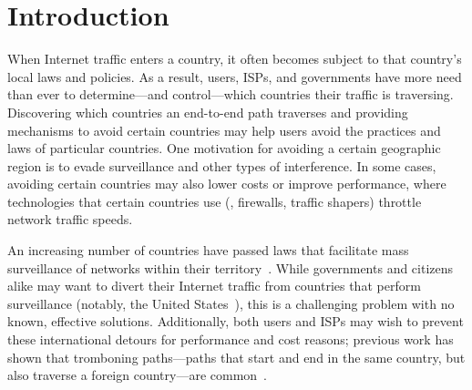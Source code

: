 \section{Introduction}
\label{intro}

When Internet traffic enters a country, it often becomes subject to that country's
local laws and policies.  As a result, users, ISPs, and governments have more need
than ever to determine---and control---which countries their traffic is
traversing.  Discovering which countries an end-to-end path traverses and
providing mechanisms to avoid certain countries may help users avoid the
 practices and laws of particular countries. One motivation for avoiding a certain 
geographic region is to evade surveillance and other types of interference.  In some
cases, avoiding certain countries may also lower costs or improve performance,
where technologies that certain countries use (\eg, firewalls, traffic
shapers) throttle network traffic speeds. 

An increasing number of countries have passed laws that facilitate mass
surveillance of networks within their territory~\cite{france_surveillance,
netherlands_surveillance, kazak_surveillance, uk_bill}. While governments and
citizens alike may want to divert their Internet traffic from countries that
perform surveillance (notably, the United States~\cite{russia_secure_internet,
routing_errors, dte}), this is a challenging problem with no known, effective 
solutions.   Additionally, both users and ISPs may wish to prevent these international detours for
performance and cost reasons; previous work has shown that tromboning
paths---paths that start and end in the same country, but also traverse a
foreign country---are common~\cite{shah2015characterizing, gupta2014peering}.

